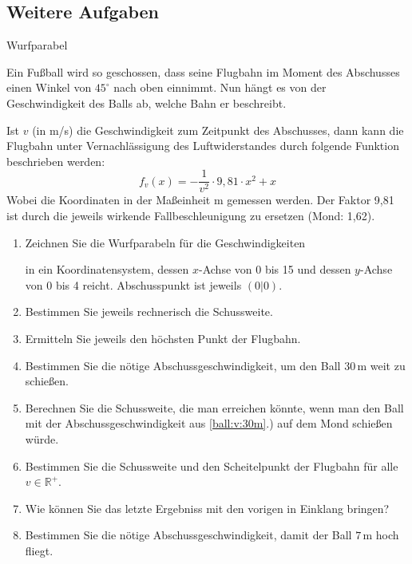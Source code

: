 \documentclass[11pt,a4paper,twoside,fleqn]{article}
\begin{document}
  \subsection{Weitere Aufgaben}
  \begin{question}
    Wurfparabel

    Ein Fußball wird so geschossen, dass seine Flugbahn im Moment des Abschusses
    einen Winkel von $45^\circ$ nach oben einnimmt. Nun hängt es von der
    Geschwindigkeit des Balls ab, welche Bahn er beschreibt.

    Ist $v$ (in m/s) die Geschwindigkeit zum Zeitpunkt des Abschusses, dann
    kann die Flugbahn unter Vernachlässigung des Luftwiderstandes
    durch folgende Funktion beschrieben werden: 
    $$f_v(x)=-\frac 1 {v^2} \cdot 9,81\cdot x^2 + x$$
    Wobei die Koordinaten in der Maßeinheit m gemessen werden.
    Der Faktor 9,81 ist durch die jeweils wirkende
    Fallbeschleunigung zu ersetzen (Mond: 1,62). 

  \begin{enumerate}\itemsep0pt
  \item Zeichnen Sie die Wurfparabeln für die Geschwindigkeiten
    \begin{enumerate}
    \end{enumerate}
    in ein Koordinatensystem, dessen $x$-Achse von 0 bis 15 und dessen
    $y$-Achse von 0 bis 4 reicht. Abschusspunkt ist jeweils $(0|0)$. 
     \item Bestimmen Sie jeweils rechnerisch die Schussweite.
    \item Ermitteln Sie jeweils den höchsten Punkt der Flugbahn.
    \item \label{ball:v:30m}Bestimmen Sie die nötige
      Abschussgeschwindigkeit, um den Ball $30\,$m weit zu schießen.
    \item Berechnen Sie die Schussweite, die man erreichen könnte,
      wenn man den Ball mit der Abschussgeschwindigkeit aus
      \ref{ball:v:30m}.)  auf dem Mond schießen würde.
    \item Bestimmen Sie die Schussweite und den Scheitelpunkt der
      Flugbahn für alle $v\in\mathbb{R}^+$.
    \item Wie können Sie das letzte Ergebniss mit den vorigen in
      Einklang bringen?
    \item Bestimmen Sie die nötige Abschussgeschwindigkeit, damit der
      Ball $7\,$m hoch fliegt.
   \end{enumerate}
\end{question}
\end{document}
